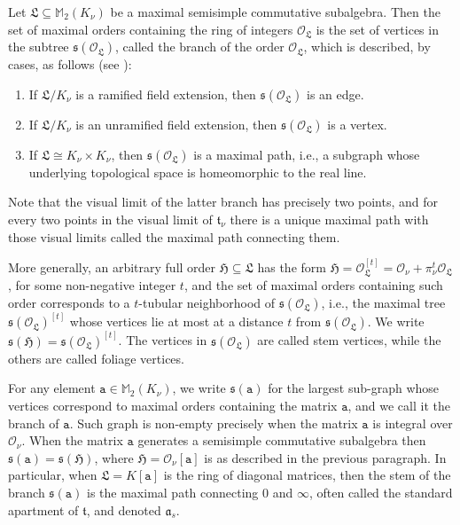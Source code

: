 \documentclass{article}
\theoremstyle{definition}
\theoremstyle{remark}
\begin{document}
Let $\mathfrak{L}\subseteq\mathbb{M}_2(K_{\nu})$ be a maximal 
semisimple commutative subalgebra. Then the set
of maximal orders containing the ring of integers
$\mathcal{O}_\mathfrak{L}$ is 
the set of vertices in the subtree 
$\mathfrak{s}(\mathcal{O}_\mathfrak{L})$, 
called the branch of the order $\mathcal{O}_\mathfrak{L}$,
which is described, by cases, as follows (see \cite{A13}):
\begin{enumerate}[label=($\diamondsuit$\bf{\arabic*})]
    \item If $\mathfrak{L}/K_{\nu}$ is a ramified 
    field extension, then 
    $\mathfrak{s}(\mathcal{O}_\mathfrak{L})$ is an edge.
    \item If $\mathfrak{L}/K_{\nu}$ is an unramified 
    field extension, then 
    $\mathfrak{s}(\mathcal{O}_\mathfrak{L})$ is a vertex.
    \item If $\mathfrak{L}\cong K_{\nu}\times K_{\nu}$, then 
    $\mathfrak{s}(\mathcal{O}_\mathfrak{L})$ is a 
    maximal path, i.e.,
    a subgraph whose underlying topological 
    space is homeomorphic to the real line.
\end{enumerate}
Note that the visual limit of the latter 
branch has precisely two points,
and for every two points in the visual limit 
of $\mathfrak{t}_\nu$
there is a unique maximal path with those visual limits called
the maximal path connecting them.

More generally, an arbitrary full order $\mathfrak{H}\subseteq
\mathfrak{L}$ has the form 
$\mathfrak{H}=\mathcal{O}_\mathfrak{L}^{[t]}=
\mathcal{O}_{\nu}+\pi_{\nu}^t\mathcal{O}_\mathfrak{L}$, 
for some non-negative integer $t$, and the set of
maximal orders containing such order 
corresponds to a $t$-tubular
neighborhood of $\mathfrak{s}(\mathcal{O}_\mathfrak{L})$,
i.e., the maximal  tree 
$\mathfrak{s}(\mathcal{O}_\mathfrak{L})^{[t]}$ 
whose vertices lie at most
at a distance $t$ from $\mathfrak{s}
(\mathcal{O}_\mathfrak{L})$. We write $\mathfrak{s}
(\mathfrak{H})=\mathfrak{s}(\mathcal{O}_\mathfrak{L})^{[t]}$.
The vertices in $\mathfrak{s}(\mathcal{O}_\mathfrak{L})$ are
called stem vertices, while the others are called 
foliage vertices. 

For any element $\mathtt{a}\in\mathbb{M}_2(K_{\nu})$, we write
$\mathfrak{s}(\mathtt{a})$ for the largest sub-graph whose vertices
correspond to maximal orders containing the matrix $\mathtt{a}$, and we
call it the branch of $\mathtt{a}$. Such graph is 
non-empty precisely when the matrix $\mathtt{a}$ is integral 
over $\mathcal{O}_\nu$.
When the matrix
$\mathtt{a}$  generates a semisimple commutative subalgebra then
$\mathfrak{s}(\mathtt{a})=\mathfrak{s}(\mathfrak{H})$, where
$\mathfrak{H}=\mathcal{O}_\nu[\mathtt{a}]$ is as described in the
previous paragraph. In particular, when $\mathfrak{L}=K[\mathtt{a}]$ 
is the ring of diagonal matrices, then the stem of the branch 
$\mathfrak{s}(\mathtt{a})$ is the maximal path connecting $0$
and $\infty$, often called the standard apartment of 
$\mathfrak{t}$, and denoted $\mathfrak{a}_s$.
\end{document}
